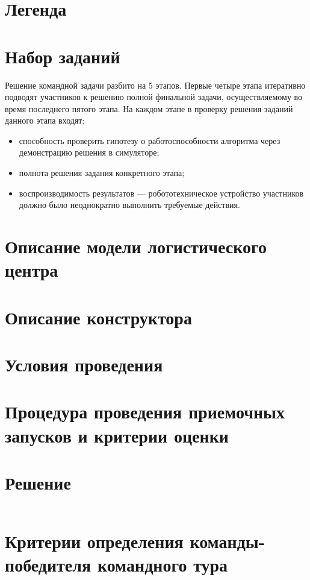 \section{Легенда}


\section{Набор заданий}

Решение командной задачи разбито на 5 этапов. Первые четыре
этапа итеративно подводят участников к решению полной финальной
задачи, осуществляемому во время последнего пятого этапа. На
каждом этапе в проверку решения заданий данного этапа входят:
\begin{itemize}
    \item способность проверить гипотезу о работоспособности алгоритма
    через демонстрацию решения в симуляторе;
    \item полнота решения задания конкретного этапа;
    \item воспроизводимость результатов --- робототехническое
    устройство участников должно было неоднократно выполнить требуемые
    действия.
\end{itemize}



\section{Описание модели логистического центра}


\section{Описание конструктора}


\section{Условия проведения}


\section{Процедура проведения приемочных запусков и
критерии оценки}



\section{Решение}
\inputminted[fontsize=\footnotesize, linenos]{js}{final/command_tour/irs/solution.js}

\section{Критерии определения команды-победителя командного тура}

